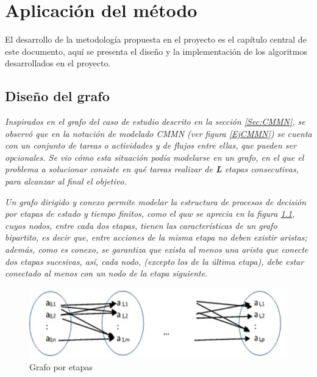 \chapter{Aplicación del método}
\label{Metodo}
El desarrollo de la metodología propuesta en el proyecto es el capítulo central de este documento, aquí se presenta el diseño y la implementación de los algoritmos desarrollados en el proyecto.





\section{Diseño del grafo}
\textit{Inspirados en el grafo del caso de estudio descrito en la sección \ref{Sec:CMMN}, se observó que en la notación de modelado CMMN (ver figura \ref{EjCMMN}) se cuenta con un conjunto de tareas o actividades y de flujos entre ellas, que pueden ser opcionales. Se vio cómo esta situación podía modelarse en un grafo, en el que el problema a solucionar consiste en qué tareas realizar de \textbf{L} etapas consecutivas, para alcanzar al final el objetivo.}

\textit{Un grafo dirigido y conexo permite modelar la estructura de procesos de decisión por etapas de estado y tiempo finitos, como el quw se aprecia en la figura \ref{GrafoEtapas}, cuyos nodos, entre cada dos etapas, tienen las características de un grafo bipartito, es decir que, entre acciones de la misma etapa no deben existir aristas; además, como es conexo, se garantiza que exista al menos una arista que conecte dos etapas sucesivas, así, cada nodo, (excepto los de la última etapa), debe estar conectado al menos con un nodo de la etapa siguiente.}

\begin{figure}[H]
  \centering
    \includegraphics[scale=0.8]{GrafoEtapas.png}
  \caption{Grafo por etapas}
  \label{GrafoEtapas}
\end{figure}

